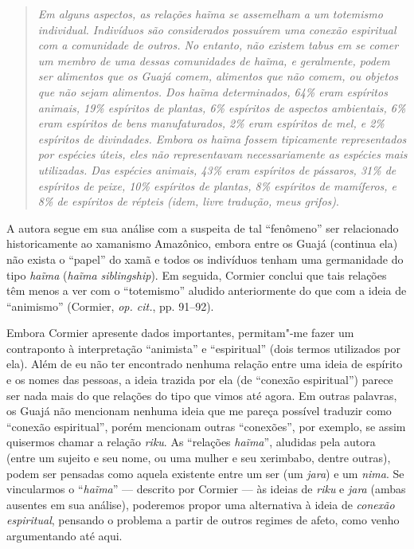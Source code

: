 \begin{quote}
\emph{Em alguns aspectos, as relações \emph{haĩma} se assemelham a um
totemismo individual. Indivíduos são considerados possuírem uma conexão
espiritual com a comunidade de outros. No entanto, não existem tabus em
se comer um membro de uma dessas comunidades de \emph{haĩma}, e
geralmente, podem ser alimentos que os Guajá comem, alimentos que não
comem, ou objetos que não sejam alimentos. Dos \emph{haĩma}
determinados, 64\% eram espíritos animais, 19\% espíritos de plantas,
6\% espíritos de aspectos ambientais, 6\% eram espíritos de bens
manufaturados, 2\% eram espíritos de mel, e 2\% espíritos de divindades.
Embora os \emph{haĩma} fossem tipicamente representados por espécies
úteis, eles não representavam necessariamente as espécies mais
utilizadas. Das espécies animais, 43\% eram espíritos de pássaros, 31\%
de espíritos de peixe, 10\% espíritos de plantas, 8\% espíritos de
mamíferos, e 8\% de espíritos de répteis (\emph{idem}, livre tradução, meus
grifos)}.
\end{quote}

A autora segue em sua análise com a suspeita de tal ``fenômeno'' ser
relacionado historicamente ao xamanismo Amazônico, embora entre os Guajá
(continua ela) não exista o ``papel'' do xamã e todos os indivíduos tenham
uma germanidade do tipo \emph{haĩma} (\emph{haĩma} \emph{siblingship}).
Em seguida, Cormier conclui que tais relações têm menos a ver com o
``totemismo'' aludido anteriormente do que com a ideia de ``animismo''
(Cormier, \emph{op. cit.}, pp. 91--92).

Embora Cormier apresente dados importantes, permitam"-me fazer um
contraponto à interpretação ``animista'' e ``espiritual'' (dois termos
utilizados por ela). Além de eu não ter encontrado nenhuma relação entre
uma ideia de espírito e os nomes das pessoas, a ideia trazida por ela
(de ``conexão espiritual'') parece ser nada mais do que relações do tipo
que vimos até agora. Em outras palavras, os Guajá não mencionam nenhuma
ideia que me pareça possível traduzir como ``conexão espiritual'', porém
mencionam outras ``conexões'', por exemplo, se assim quisermos chamar a
relação \emph{riku}. As ``relações \emph{haĩma}'', aludidas pela autora
(entre um sujeito e seu nome, ou uma mulher e seu xerimbabo, dentre
outras), podem ser pensadas como aquela existente entre um ser (um
\emph{jara}) e um \emph{nima}. Se vincularmos o ``\emph{haĩma}'' ---
descrito por Cormier --- às ideias de \emph{riku} e \emph{jara} (ambas
ausentes em sua análise), poderemos propor uma alternativa à ideia de
\emph{conexão espiritual}, pensando o problema a partir de outros
regimes de afeto, como venho argumentando até aqui.

